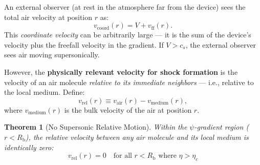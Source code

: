 \documentclass[12pt, letterpaper]{article}
\newtheorem{theorem}{Theorem}
\theoremstyle{definition}
\theoremstyle{remark}
\newcommand{\etac}{\eta_c}
\newcommand{\Rbub}{R_{\mathrm{b}}}
\newcommand{\cs}{c_s}
\begin{document}
An external observer (at rest in the atmosphere far from the device) sees the
total air velocity at position $r$ as:
\begin{equation}
v_{\mathrm{coord}}(r) = V + v_{\mathrm{ff}}(r).
\label{eq:v-coord}
\end{equation}
This \emph{coordinate velocity} can be arbitrarily large --- it is the sum of
the device's velocity plus the freefall velocity in the gradient. If $V > \cs$,
the external observer sees air moving supersonically.

However, the \textbf{physically relevant velocity for shock formation} is the
velocity of an air molecule \emph{relative to its immediate neighbors} ---
i.e., relative to the local medium. Define:
\begin{equation}
v_{\mathrm{rel}}(r) \equiv v_{\mathrm{air}}(r) - v_{\mathrm{medium}}(r),
\label{eq:v-rel}
\end{equation}
where $v_{\mathrm{medium}}(r)$ is the bulk velocity of the air at position $r$.

\begin{theorem}[No Supersonic Relative Motion]
\label{thm:no-shock}
Within the $\psi$-gradient region ($r < \Rbub$), the relative velocity between
any air molecule and its local medium is identically zero:
\begin{equation}
\boxed{v_{\mathrm{rel}}(r) = 0 \quad \text{for all } r < \Rbub \text{ where } \eta > \etac}
\end{equation}
\end{theorem}
\end{document}
